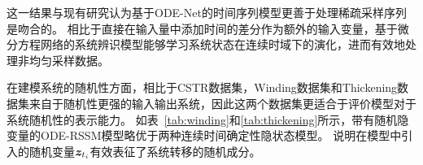 这一结果与现有研究认为基于ODE-Net的时间序列模型更善于处理稀疏采样序列是吻合的\cite{Quaglino2019}。
相比于直接在输入量中添加时间的差分作为额外的输入变量，基于微分方程网络的系统辨识模型能够学习系统状态在连续时域下的演化，进而有效地处理非均匀采样数据。



在建模系统的随机性方面，相比于CSTR数据集，Winding数据集和Thickening数据集来自于随机性更强的输入输出系统，因此这两个数据集更适合于评价模型对于系统随机性的表示能力。
如表~\ref{tab:winding}和\ref{tab:thickening}所示，带有随机隐变量的ODE-RSSM模型略优于两种连续时间确定性隐状态模型。
说明在模型中引入的随机变量$\boldsymbol{z}_{t_i}$有效表征了系统转移的随机成分。

